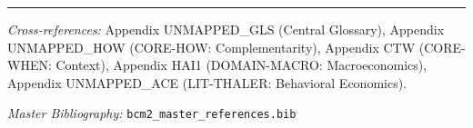 \vspace{1em}
\hrule
\vspace{0.5em}

\noindent\textit{Cross-references:}
Appendix UNMAPPED_GLS (Central Glossary),
Appendix UNMAPPED_HOW (CORE-HOW: Complementarity),
Appendix CTW (CORE-WHEN: Context),
Appendix HAI1 (DOMAIN-MACRO: Macroeconomics),
Appendix UNMAPPED_ACE (LIT-THALER: Behavioral Economics).

\noindent\textit{Master Bibliography:} \texttt{bcm2\_master\_references.bib}


